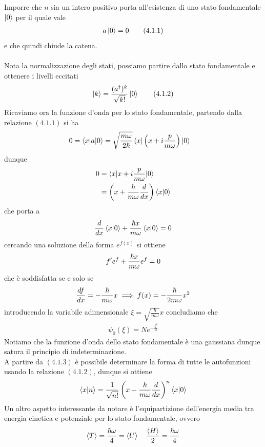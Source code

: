 \documentclass{article}
\begin{document}
Imporre che $n$ sia un intero positivo porta all'esistenza di uno stato fondamentale $\ket{0}$ per il quale vale
\begin{gather}
    a\ket{0} = 0 \tag{4.1.1}
\end{gather}
e che quindi chiude la catena. \\ \\
Nota la normalizzazione degli stati, possiamo partire dallo stato fondamentale e ottenere i livelli eccitati
\begin{gather}
    \ket{k} = \frac{(a^\dagger)^k}{\sqrt{k!}}\ket{0} \tag{4.1.2}
\end{gather}
Ricaviamo ora la funzione d'onda per lo stato fondamentale, partendo dalla relazione $(4.1.1)$ si ha
\begin{align}
    0 = \braket{x|a|0} &= \sqrt{\frac{m\omega}{2\hbar}}\braket{x|\left(x + i\frac{p}{m\omega}\right)|0} \notag
\end{align}
dunque
\begin{align}
    0 &= \braket{x|x + i\frac{p}{m\omega}|0} \notag \\
    &= \left(x +\frac{\hbar}{m\omega}\frac{d}{dx}\right)\braket{x|0} \notag
\end{align}
che porta a
\begin{align}
    \frac{d}{dx}\braket{x|0} + \frac{\hbar x}{m\omega}\braket{x|0} = 0 \notag
\end{align}
cercando una soluzione della forma $e^{f(x)}$ si ottiene
\begin{gather}
    f'e^f + \frac{\hbar x}{m\omega}e^f = 0 \notag
\end{gather}
che è soddisfatta se e solo se
\begin{gather}
    \frac{df}{dx} = -\frac{\hbar}{m\omega}x \implies f(x) = -\frac{\hbar}{2m\omega}x^2 \notag
\end{gather}
introducendo la variabile adimensionale $\xi = \sqrt{\frac{\hbar}{m\omega}}x$ concludiamo che
\begin{gather}
    \psi_0(\xi) = Ne^{-\frac{\xi^2}{2}} \tag{4.1.3}
\end{gather}
Notiamo che la funzione d'onda dello stato fondamentale è una gaussiana dunque satura il principio di indeterminazione. \\
A partire da $(4.1.3)$ è possibile determinare la forma di tutte le autofunzioni usando la relazione $(4.1.2)$, dunque si ottiene
\begin{align}
    \braket{x|n} = \frac{1}{\sqrt{n!}}\left(x - \frac{\hbar}{m\omega}\frac{d}{dx}\right)^n\braket{x|0} \notag
\end{align}
Un altro aspetto interessante da notare è l'equipartizione dell'energia media tra energia cinetica e potenziale per lo stato fondamentale, ovvero
\begin{gather}
    \braket{T} = \frac{\hbar\omega}{4} = \braket{U} \quad \frac{\braket{H}}{2} = \frac{\hbar\omega}{4} \notag
\end{gather}
\end{document}
